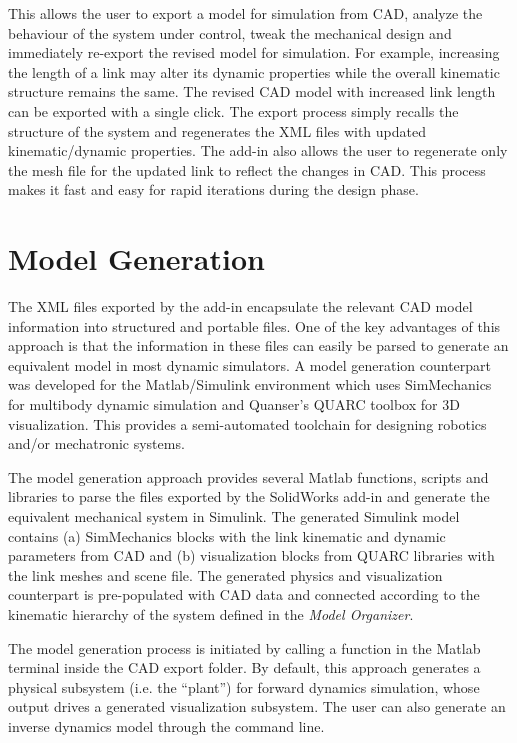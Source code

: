 This allows the user to export a model for simulation from CAD, analyze the behaviour of the system under control, tweak the mechanical design and immediately re-export the revised model for simulation. For example, increasing the length of a link may alter its dynamic properties  while the overall kinematic structure remains the same. The revised CAD model with increased link length can be exported with a single click. The export process simply recalls the structure of the system and regenerates the XML files with updated kinematic/dynamic properties. The add-in also allows the user to regenerate only the mesh file for the updated link to reflect the changes in CAD. This process makes it fast and easy for rapid iterations during the design phase.


\section{Model Generation} %
\label{sec:model_generation}

The XML files exported by the add-in encapsulate the relevant CAD model information into structured and portable files. One of the key advantages of this approach is that the information in these files can easily be parsed to generate an equivalent model in most dynamic simulators. A model generation counterpart was developed for the Matlab/Simulink environment which uses SimMechanics for multibody dynamic simulation and Quanser's QUARC toolbox for 3D visualization. This provides a semi-automated toolchain for designing robotics and/or mechatronic systems.

The model generation approach provides several Matlab functions, scripts and libraries to parse the files exported by the SolidWorks add-in and generate the equivalent mechanical system in Simulink. The generated Simulink model contains (a) SimMechanics blocks with the link kinematic and dynamic parameters from CAD and (b) visualization blocks from QUARC libraries with the link meshes and scene file. The generated physics and visualization counterpart is pre-populated with CAD data and connected according to the kinematic hierarchy of the system defined in the \emph{Model Organizer}.

The model generation process is initiated by calling a function in the Matlab terminal inside the CAD export folder. By default, this approach generates a physical subsystem (i.e. the “plant”) for forward dynamics simulation, whose output drives a generated visualization subsystem. The user can also generate an inverse dynamics model through the command line.

